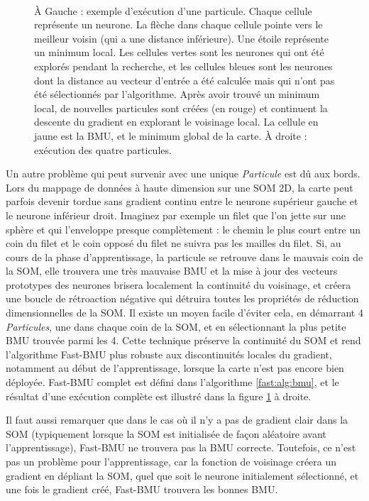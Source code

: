 	\begin{figure}[!t]
    	\centering
    	\ \ \ \ \ \ \ 
    	
		\caption[Visualisation de l'algorithme de particule]{À Gauche : exemple d'exécution d'une particule. Chaque cellule représente un neurone. La flèche dans chaque cellule pointe vers le meilleur voisin (qui a une distance inférieure). Une étoile représente un minimum local. Les cellules vertes sont les neurones qui ont été explorés pendant la recherche, et les cellules bleues sont les neurones dont la distance au vecteur d'entrée a été calculée mais qui n'ont pas été sélectionnés par l'algorithme. Après avoir trouvé un minimum local, de nouvelles particules sont créées (en rouge) et continuent la descente du gradient en explorant le voisinage local. La cellule en jaune est la BMU, et le minimum global de la carte. À droite : exécution des quatre particules.}
    	\label{fig:first_particle}
	\end{figure}

	Un autre problème qui peut survenir avec une unique \textit{Particule} est dû aux bords. Lors du mappage de données à haute dimension sur une SOM 2D, la carte peut parfois devenir tordue sans gradient continu entre le neurone supérieur gauche et le neurone inférieur droit. Imaginez par exemple un filet que l'on jette sur une sphère et qui l'enveloppe presque complètement : le chemin le plus court entre un coin du filet et le coin opposé du filet ne suivra pas les mailles du filet. Si, au cours de la phase d'apprentissage, la particule se retrouve dans le mauvais coin de la SOM, elle trouvera une très mauvaise BMU et la mise à jour des vecteurs prototypes des neurones brisera localement la continuité du voisinage, et créera une boucle de rétroaction négative qui détruira toutes les propriétés de réduction dimensionnelles de la SOM. Il existe un moyen facile d'éviter cela, en démarrant 4 \textit{Particules}, une dans chaque coin de la SOM, et en sélectionnant la plus petite BMU trouvée parmi les 4. Cette technique préserve la continuité du SOM et rend l'algorithme Fast-BMU plus robuste aux discontinuités locales du gradient, notamment au début de l'apprentissage, lorsque la carte n'est pas encore bien déployée. Fast-BMU complet est défini dans l'algorithme \ref{fast:alg:bmu}, et le résultat d'une exécution complète est illustré dans la figure \ref{fig:first_particle} à droite.
	
	Il faut aussi remarquer que dans le cas où il n'y a pas de gradient clair dans la SOM (typiquement lorsque la SOM est initialisée de façon aléatoire avant l'apprentissage), Fast-BMU ne trouvera pas la BMU correcte. Toutefois, ce n'est pas un problème pour l'apprentissage, car la fonction de voisinage créera un gradient en dépliant la SOM, quel que soit le neurone initialement sélectionné, et une fois le gradient créé, Fast-BMU trouvera les bonnes BMU.

